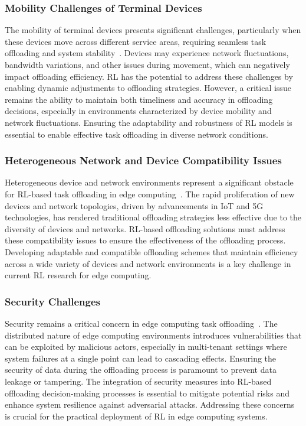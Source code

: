 \documentclass[journal]{IEEEtran}
\begin{document}
\subsubsection{Mobility Challenges of Terminal Devices}
The mobility of terminal devices presents significant challenges, particularly when these devices move across different service areas, requiring seamless task offloading and system stability~\cite{zhou08, zhou09}. Devices may experience network fluctuations, bandwidth variations, and other issues during movement, which can negatively impact offloading efficiency. RL has the potential to address these challenges by enabling dynamic adjustments to offloading strategies. However, a critical issue remains the ability to maintain both timeliness and accuracy in offloading decisions, especially in environments characterized by device mobility and network fluctuations. Ensuring the adaptability and robustness of RL models is essential to enable effective task offloading in diverse network conditions.

\subsubsection{Heterogeneous Network and Device Compatibility Issues}
Heterogeneous device and network environments represent a significant obstacle for RL-based task offloading in edge computing~\cite{zhou09}. The rapid proliferation of new devices and network topologies, driven by advancements in IoT and 5G technologies, has rendered traditional offloading strategies less effective due to the diversity of devices and networks. RL-based offloading solutions must address these compatibility issues to ensure the effectiveness of the offloading process. Developing adaptable and compatible offloading schemes that maintain efficiency across a wide variety of devices and network environments is a key challenge in current RL research for edge computing.

\subsubsection{Security Challenges}
Security remains a critical concern in edge computing task offloading~\cite{zhou07, zhou08, zhou09}. The distributed nature of edge computing environments introduces vulnerabilities that can be exploited by malicious actors, especially in multi-tenant settings where system failures at a single point can lead to cascading effects. Ensuring the security of data during the offloading process is paramount to prevent data leakage or tampering. The integration of security measures into RL-based offloading decision-making processes is essential to mitigate potential risks and enhance system resilience against adversarial attacks. Addressing these concerns is crucial for the practical deployment of RL in edge computing systems.
\end{document}
